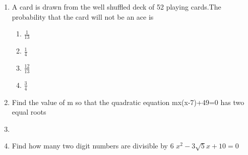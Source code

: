 \documentclass[journal,12pt,twocolumn]{IEEEtran}
\renewcommand\thesection{\arabic{section}}
\begin{document}
\begin{enumerate}[label=\thesection.\arabic*.,ref=\thesection.\theenumi]
\item A card is drawn from the well shuffled deck of 52 playing cards.The probability that the card will not be an ace is
\begin{enumerate}
    \item $\frac{1}{13}$
    \item $\frac{1}{4}$
    \item $\frac{12}{13}$
    \item $\frac{3}{4}$
\end{enumerate}

\item Find the value of m so that the quadratic equation mx(x-7)+49=0 has two equal roots
\item 
\item Find how many two digit numbers are divisible by 6
$x^2-3\sqrt{5}x+10=0$ \\


\end{enumerate}
\end{document}
